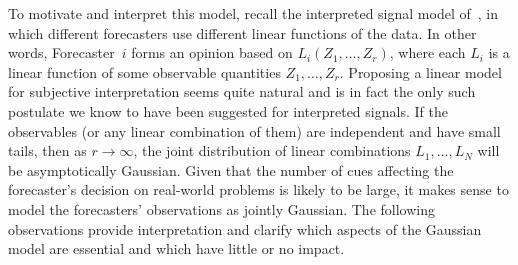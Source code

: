 \documentclass[11pt]{article}
\theoremstyle{definition}
\theoremstyle{definition}
\begin{document}
To motivate and interpret this model, recall the interpreted signal
model of~\citet{broomell2009experts}, in which different forecasters
use different linear functions of the data.  In other words,
Forecaster~$i$ forms an opinion based on $L_i (Z_1 , \ldots , Z_r)$,
where each $L_i$ is a linear function of some observable quantities
$Z_1 , \ldots , Z_r$.  Proposing a linear model for subjective
interpretation seems quite natural and is in fact the only such
postulate we know to have been suggested for interpreted signals.  If
the observables (or any linear combination of them) are independent
and have small tails, then as $r \to \infty$, the joint distribution
of linear combinations $L_1 , \ldots , L_N$ will be asymptotically
Gaussian.  Given that the number of cues affecting the forecaster's
decision on real-world problems is likely to be large, it makes sense
to model the forecasters' observations as jointly Gaussian.  The
following observations provide interpretation and clarify which
aspects of the Gaussian model are essential and which have little or
no impact.
\end{document}

